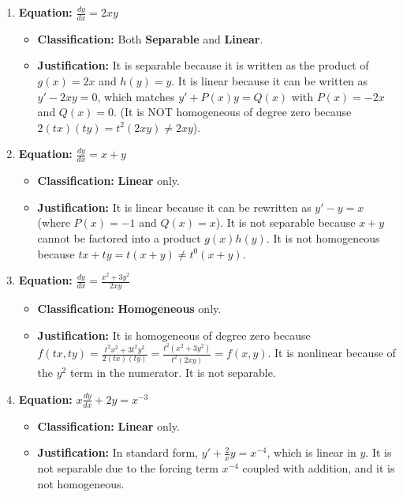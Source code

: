 \documentclass[11pt,letterpaper]{article}
\begin{document}
\begin{enumerate}[label=\textbf{\arabic*.}]
    \item \textbf{Equation:} $\frac{dy}{dx} = 2xy$
    \begin{itemize}
        \item \textbf{Classification:} Both \textbf{Separable} and \textbf{Linear}.
        \item \textbf{Justification:} It is separable because it is written as the product of $g(x) = 2x$ and $h(y) = y$. It is linear because it can be written as $y' - 2xy = 0$, which matches $y' + P(x)y = Q(x)$ with $P(x) = -2x$ and $Q(x) = 0$. (It is NOT homogeneous of degree zero because $2(tx)(ty) = t^2(2xy) \neq 2xy$).
    \end{itemize}

    \item \textbf{Equation:} $\frac{dy}{dx} = x + y$
    \begin{itemize}
        \item \textbf{Classification:} \textbf{Linear} only.
        \item \textbf{Justification:} It is linear because it can be rewritten as $y' - y = x$ (where $P(x) = -1$ and $Q(x) = x$). It is not separable because $x+y$ cannot be factored into a product $g(x)h(y)$. It is not homogeneous because $tx + ty = t(x+y) \neq t^0(x+y)$.
    \end{itemize}

    \item \textbf{Equation:} $\frac{dy}{dx} = \frac{x^2 + 3y^2}{2xy}$
    \begin{itemize}
        \item \textbf{Classification:} \textbf{Homogeneous} only.
        \item \textbf{Justification:} It is homogeneous of degree zero because $f(tx, ty) = \frac{t^2x^2 + 3t^2y^2}{2(tx)(ty)} = \frac{t^2(x^2 + 3y^2)}{t^2(2xy)} = f(x,y)$. It is nonlinear because of the $y^2$ term in the numerator. It is not separable.
    \end{itemize}

    \item \textbf{Equation:} $x \frac{dy}{dx} + 2y = x^{-3}$
    \begin{itemize}
        \item \textbf{Classification:} \textbf{Linear} only.
        \item \textbf{Justification:} In standard form, $y' + \frac{2}{x} y = x^{-4}$, which is linear in $y$. It is not separable due to the forcing term $x^{-4}$ coupled with addition, and it is not homogeneous.
    \end{itemize}


\end{enumerate}
\end{document}
